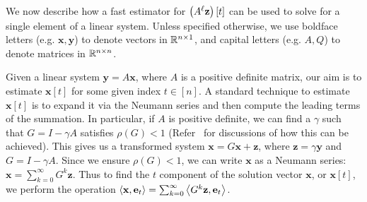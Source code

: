 We now describe how a fast estimator for $\left(A^{\ell}\mathbf{z}\right)[t]$ can be used to solve for a single element of a linear system.
Unless specified otherwise, we use boldface letters (e.g. $\mathbf{x},\mathbf{y}$) to denote vectors in $\mathbb{R}^{n\times 1}$, and capital letters (e.g. $A,Q$) to denote matrices in $\mathbb{R}^{n\times n}$.


Given a linear system $\mathbf{y} = A\mathbf{x}$, where $A$ is a positive definite matrix, our aim is to estimate $\mathbf{x}[t]$ for some given index $t\in[n]$. 
A standard technique to estimate $\mathbf{x}[t]$ is to expand it via the Neumann series and then compute the leading terms of the summation.
In particular, if $A$ is positive definite, we can find a $\gamma$ such that $G = I - \gamma A$ satisfies $\rho(G) < 1$ (Refer~\cite{dimov2015new,lee2014asynchronous} for discussions of how this can be achieved). 
This gives us a transformed system $\mathbf{x} = G\mathbf{x} + \mathbf{z}$, where $\mathbf{z} = \gamma \mathbf{y}$ and $G = I - \gamma A$. 
Since we ensure $\rho(G)<1$, we can write $\mathbf{x}$ as a Neumann series: $\mathbf{x} = \sum_{k=0}^\infty G^k \mathbf{z}$.
Thus to find the $t$ component of the solution vector $\mathbf{x}$, or $\mathbf{x}[t]$, we perform the operation $\left< \mathbf{x}, \mathbf{e}_t \right> = \sum_{k=0}^\infty \left< G^k \mathbf{z}, \mathbf{e}_t \right>$. 


